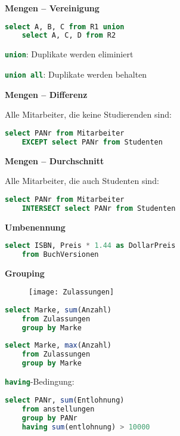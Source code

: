 \textbf{Mengen -- Vereinigung}
\begin{items}
	\item 
	\begin{lstlisting}[language=sql]
select A, B, C from R1 union 
	select A, C, D from R2
	\end{lstlisting}
	\item \lstinline[language=sql]{union}: Duplikate werden eliminiert
	\item \lstinline[language=sql]{union all}: Duplikate werden behalten
\end{items}

\textbf{Mengen -- Differenz}
\begin{items}
	\item Alle Mitarbeiter, die keine Studierenden sind:
	\begin{lstlisting}[language=sql]
select PANr from Mitarbeiter
	EXCEPT select PANr from Studenten
	\end{lstlisting}
\end{items}

\textbf{Mengen -- Durchschnitt}
\begin{items}
	\item Alle Mitarbeiter, die auch Studenten sind:
	\begin{lstlisting}[language=sql]
select PANr from Mitarbeiter
	INTERSECT select PANr from Studenten
	\end{lstlisting}
\end{items}

\textbf{Umbenennung}
\begin{items}
	\item
	\begin{lstlisting}[language=sql]
select ISBN, Preis * 1.44 as DollarPreis 
	from BuchVersionen
	\end{lstlisting}
\end{items}

\textbf{Grouping}
\begin{figure}[H]\centering\label{Zulassungen}\texttt{[image: Zulassungen]}\end{figure}
\begin{items}
	\item
	\begin{lstlisting}[language=sql]
select Marke, sum(Anzahl)
	from Zulassungen
	group by Marke
	\end{lstlisting}
	\item 
	\begin{lstlisting}[language=sql]
select Marke, max(Anzahl)
	from Zulassungen
	group by Marke
	\end{lstlisting}
	\item \lstinline[language=sql]{having}-Bedingung:
	\begin{lstlisting}[language=sql]
select PANr, sum(Entlohnung)
	from anstellungen
	group by PANr
	having sum(entlohnung) > 10000
	\end{lstlisting}
\end{items}

